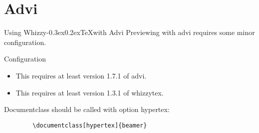 \documentclass[xcolor=pst,compress]{beamer}
\makeatletter
\def \WhizzyTeX {{Whizzy\kern -0.3ex\raise 0.2ex\hbox{\let \@\relax\TeX}}}
\makeatother
\begin{document}
\section{Advi}
\begin{frame}{Using \WhizzyTeX with Advi}
Previewing with advi requires some minor configuration. 
\end{frame}
\begin{frame}[fragile=singleslide]{Configuration}
\begin{itemize}
\item This requires at least version 1.7.1 of advi.
\item This requires at least version 1.3.1 of whizzytex. 
\end{itemize}
Documentclass should be called with option hypertex:
\begin{verbatim}
        \documentclass[hypertex]{beamer}
\end{verbatim}
\end{frame}
\end{document}
